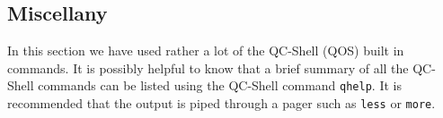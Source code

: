 \subsection{Miscellany}
In this section we have used rather a lot of the QC-Shell (QOS) built
in commands. It is possibly helpful to know that a brief summary of all 
the QC-Shell commands can be listed using the QC-Shell command {\tt qhelp}.
It is recommended that the output is piped through a pager such as {\tt less}
or {\tt more}.

